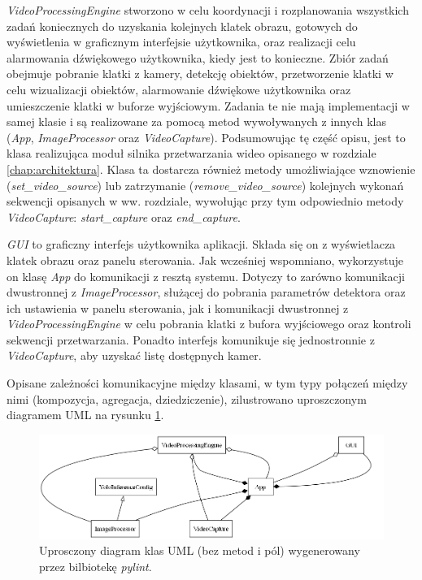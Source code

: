 \emph{VideoProcessingEngine} stworzono w celu koordynacji i rozplanowania wszystkich zadań koniecznych do uzyskania kolejnych klatek obrazu, gotowych do wyświetlenia w graficznym interfejsie użytkownika, oraz realizacji celu alarmowania dźwiękowego użytkownika, kiedy jest to konieczne. Zbiór zadań obejmuje pobranie klatki z kamery, detekcję obiektów, przetworzenie klatki w celu wizualizacji obiektów, alarmowanie dźwiękowe użytkownika oraz umieszczenie klatki w buforze wyjściowym. Zadania te nie mają implementacji w samej klasie i są realizowane za pomocą metod wywoływanych z innych klas (\emph{App}, \emph{ImageProcessor} oraz \emph{VideoCapture}).
Podsumowując tę część opisu, jest to klasa realizująca moduł silnika przetwarzania wideo opisanego w rozdziale \ref{chap:architektura}. Klasa ta dostarcza również metody umożliwiające wznowienie (\emph{set\_video\_source}) lub zatrzymanie (\emph{remove\_video\_source}) kolejnych wykonań sekwencji opisanych w ww. rozdziale, wywołując przy tym odpowiednio metody \emph{VideoCapture}: \emph{start\_capture} oraz \emph{end\_capture}.

\emph{GUI} to graficzny interfejs użytkownika aplikacji. Składa się on z wyświetlacza klatek obrazu oraz panelu sterowania. Jak wcześniej wspomniano, wykorzystuje on klasę \emph{App} do komunikacji z resztą systemu. Dotyczy to zarówno komunikacji dwustronnej z \emph{ImageProcessor}, służącej do pobrania parametrów detektora oraz ich ustawienia w panelu sterowania, jak i komunikacji dwustronnej z \emph{VideoProcessingEngine} w celu pobrania klatki z bufora wyjściowego oraz kontroli sekwencji przetwarzania. Ponadto interfejs komunikuje się jednostronnie z \emph{VideoCapture}, aby uzyskać listę dostępnych kamer.

Opisane zależności komunikacyjne między klasami, w tym typy połączeń między nimi (kompozycja, agregacja, dziedziczenie), zilustrowano uproszczonym diagramem UML na rysunku \ref{fig:uprosczony-diagram-klas}. 

\begin{figure}[H]
    \centering
    \includegraphics[width=\linewidth]{r_implementacja/klasy/simplified_classes.png}
    \caption{Uprosczony diagram klas UML (bez metod i pól) wygenerowany przez bilbiotekę \emph{pylint}.}
    \label{fig:uprosczony-diagram-klas}
\end{figure}

